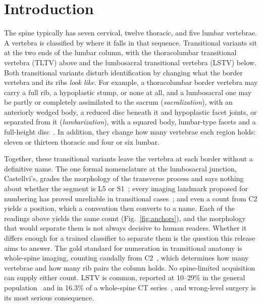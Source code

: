 \documentclass[aapm,mph,amsmath,amssymb,preprint,linenumbers]{revtex4-2}
\begin{document}
\maketitle

\section{Introduction}

The spine typically has seven cervical, twelve thoracic, and five lumbar vertebrae. A
vertebra is classified by where it falls in that sequence. Transitional variants sit at the
two ends of the lumbar column, with the thoracolumbar transitional vertebra (TLTV) above and the
lumbosacral transitional vertebra (LSTV) below. Both transitional variants disturb identification by changing what the border vertebra
and its ribs \emph{look like}. For example, a thoracolumbar border vertebra may carry a full rib, a hypoplastic stump, or none at all, and
a lumbosacral one may be partly or completely assimilated to the sacrum
(\emph{sacralization}), with an anteriorly wedged body, a reduced disc beneath it and
hypoplastic facet joints, or separated from it (\emph{lumbarization}), with a
squared body, lumbar-type facets and a full-height disc~\cite{koninwalz2010}. In addition, they
change how many vertebrae each region holds: eleven or thirteen thoracic and four or six lumbar.

Together, these transitional variants leave the vertebra at each border without a definitive name. The one formal nomenclature at the lumbosacral junction, Castellvi's, grades the morphology of the transverse process and says nothing about whether the segment is L5 or S1~\cite{castellvi1984,koninwalz2010}; every imaging landmark proposed for numbering has proved unreliable in transitional cases~\cite{carrino2011,farshad2015,tureli2014}; and even a count from C2 yields a position, which a convention then converts to a name. Each of the readings above yields the same count (Fig.~\ref{fig:anchors}), and the morphology that would
separate them is not always decisive to human readers. Whether it differs
enough for a trained classifier to separate them is the question this release aims to answer. The gold standard for numeration in
transitional anatomy is whole-spine imaging, counting caudally from C2~\cite{lian2018},
which determines how many vertebrae and how many rib pairs the column holds. No
spine-limited acquisition can supply either count. LSTV is common, reported at 10--29\% in the general
population~\cite{hanhivaara2022} and in 16.3\% of a whole-spine CT
series~\cite{nagata2025}, and wrong-level surgery is its most serious consequence.
\end{document}
